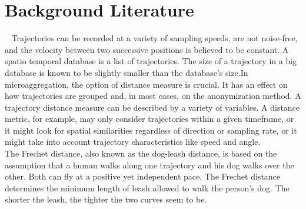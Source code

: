 \section{Background Literature}~\label{sec:literature}
Trajectories can be recorded at a variety of sampling speeds, are not noise-free, and the velocity between two successive positions is believed to be constant. A spatio temporal database is a list of trajectories. The size of a trajectory in a big database is known to be slightly smaller than the database's size.In microaggregation, the option of distance measure is crucial. It has an effect on how trajectories are grouped and, in most cases, on the anonymization method. A trajectory distance measure can be described by a variety of variables. A distance metric, for example, may only consider trajectories within a given timeframe, or it might look for spatial similarities regardless of direction or sampling rate, or it might take into account trajectory characteristics like speed and angle.\\
The Frechet distance, also known as the dog-leash distance, is based on the assumption that a human walks along one trajectory and his dog walks over the other. Both can fly at a positive yet independent pace. The Frechet distance determines the minimum length of leash allowed to walk the person's dog.
The shorter the leash, the tighter the two curves seem to be.